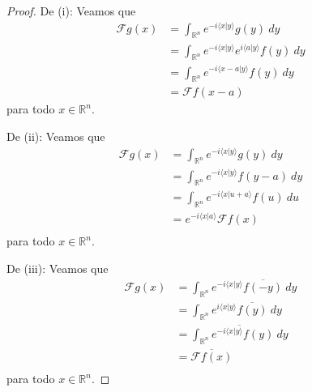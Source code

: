\documentclass[12pt]{report}
\newcounter{it}
\theoremstyle{largebreak}
\newcommand\pint[2]{\ensuremath{\langle#1| #2\rangle}}
\newcommand\conj[1]{\ensuremath{\overline{#1}}}
\newcommand{\fou}[1]{\ensuremath{\mathcal{F}#1}}
\begin{document}
    \begin{proof}
        De (i): Veamos que
        \begin{equation*}
            \begin{split}
                \fou{g}(x)&=\int_{\mathbb{R}^n}e^{ -i\pint{x}{y}}g(y)\:dy\\
                &=\int_{\mathbb{R}^n}e^{ -i\pint{x}{y}}e^{ i\pint{a}{y}}f(y)\:dy\\
                &=\int_{\mathbb{R}^n}e^{ -i\pint{x-a}{y}}f(y)\:dy\\
                &=\fou{f}(x-a)
            \end{split}
        \end{equation*}
        para todo $x\in\mathbb{R}^n$.

        De (ii): Veamos que
        \begin{equation*}
            \begin{split}
                \fou{g}(x)&=\int_{\mathbb{R}^n}e^{ -i\pint{x}{y}}g(y)\:dy\\
                &=\int_{\mathbb{R}^n}e^{ -i\pint{x}{y}}f(y-a)\:dy\\
                &=\int_{\mathbb{R}^n}e^{ -i\pint{x}{u+a}}f(u)\:du\\
                &=e^{ -i\pint{x}{a}}\fou{f}(x) \\
            \end{split}
        \end{equation*}
        para todo $x\in\mathbb{R}^n$.

        De (iii): Veamos que
        \begin{equation*}
            \begin{split}
                \fou{g}(x)&=\int_{\mathbb{R}^n}e^{-i\pint{x}{y}}\conj{f(-y)}\:dy\\
                &=\int_{\mathbb{R}^n}e^{i\pint{x}{y}}\conj{f(y)}\:dy\\
                &=\conj{\int_{\mathbb{R}^n}e^{-i\pint{x}{y}}f(y)\:dy}\\
                &=\conj{\fou{f}(x)}\\
            \end{split}
        \end{equation*}
        para todo $x\in\mathbb{R}^n$.
        

\end{proof}
\end{document}
